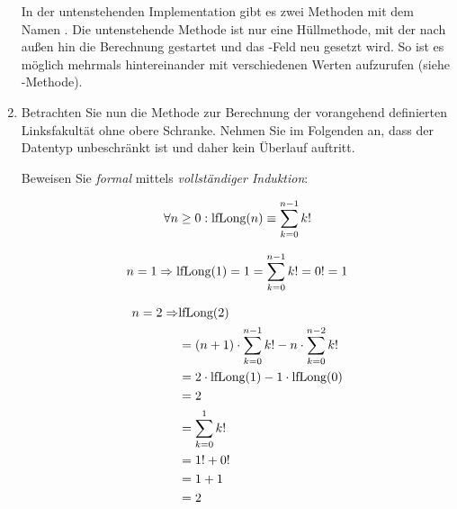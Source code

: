 \documentclass{lehramt-informatik-aufgabe}
\begin{document}
\begin{enumerate}
\begin{liAntwort}
In der untenstehenden Implementation gibt es zwei Methoden mit dem Namen
. Die untenstehende Methode ist nur eine Hüllmethode, mit
der nach außen hin die Berechnung gestartet und das
-Feld neu gesetzt wird. So ist es möglich
 mehrmals hintereinander mit verschiedenen Werten
aufzurufen (siehe -Methode).

\end{liAntwort}


\item Betrachten Sie nun die Methode  zur
Berechnung der vorangehend definierten Linksfakultät ohne obere
Schranke. Nehmen Sie im Folgenden an, dass der Datentyp
 unbeschränkt ist und daher kein Überlauf auftritt.


Beweisen Sie \emph{formal} mittels \emph{vollständiger Induktion}:

\begin{displaymath}
\forall n \geq 0: \text{lfLong}(n) \equiv \sum^{n-1}_{k=0}k!
\end{displaymath}

\begin{liAntwort}

%

\liInduktionAnfang

\begin{displaymath}
n=1 \Rightarrow
\text{lfLong}(1) =
1 =
\sum^{n-1}_{k=0}k! =
0! =
1
\end{displaymath}

\begin{equation*}
\begin{split}
n=2 \Rightarrow & \text{lfLong}(2)\\
& = (n+1) \cdot \sum^{n-1}_{k=0}k! - n \cdot \sum^{n-2}_{k=0}k! \\
& = 2 \cdot \text{lfLong}(1) - 1 \cdot \text{lfLong}(0) \\
& = 2 \\
& = \sum^{1}_{k=0}k! \\
& = 1! + 0! \\
& = 1 + 1 \\
& = 2
\end{split}
\end{equation*}

%

\liInduktionVoraussetzung


\end{liAntwort}
\end{enumerate}
\end{document}
